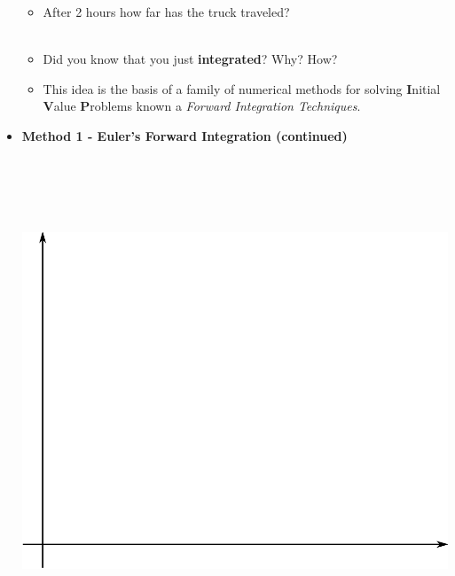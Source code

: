 \documentclass[11pt]{article}
\begin{document}
\begin{itemize}
\begin{itemize}
			\item After 2 hours how far has the truck traveled?\\\\
			
			\item Did you know that you just {\bf integrated}? Why? How?\vspace{40mm}\\
			
			\item This idea is the basis of a family of numerical methods for solving {\bf I}nitial {\bf V}alue {\bf P}roblems known a {\it Forward Integration Techniques}.
		\end{itemize}	
		
		\newpage

\item \textbf{\LARGE Method 1 - Euler's Forward Integration (continued)}\\

	\vspace{5mm}\\ 
	\vspace{5mm}\\ 
	\vspace{10mm}\\\\\\
	
	
		\includegraphics[scale=0.5]{lecture1_fig2.png}\\\\

	
\end{itemize}


	
\end{document}
